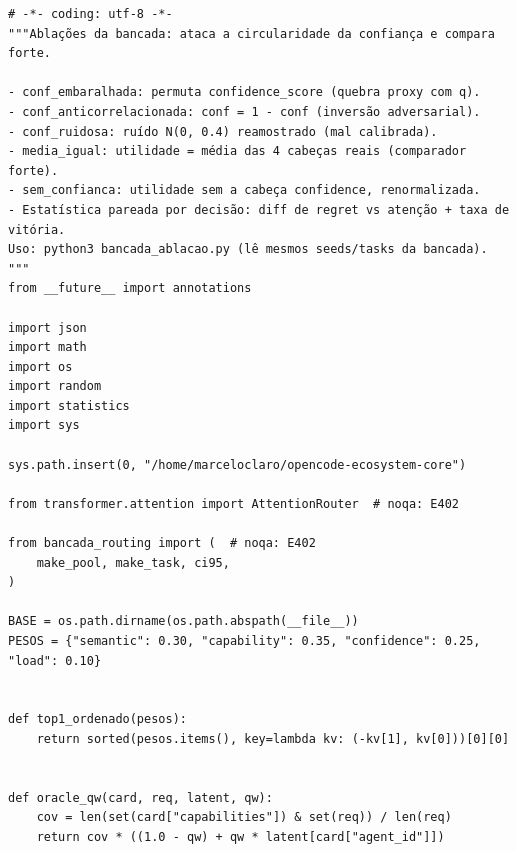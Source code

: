 \documentclass[12pt,openany,oneside,a4paper,brazil,chapter=TITLE]{abntex2}
\begin{document}
\begin{lstlisting}
# -*- coding: utf-8 -*-
"""Ablações da bancada: ataca a circularidade da confiança e compara forte.

- conf_embaralhada: permuta confidence_score (quebra proxy com q).
- conf_anticorrelacionada: conf = 1 - conf (inversão adversarial).
- conf_ruidosa: ruído N(0, 0.4) reamostrado (mal calibrada).
- media_igual: utilidade = média das 4 cabeças reais (comparador forte).
- sem_confianca: utilidade sem a cabeça confidence, renormalizada.
- Estatística pareada por decisão: diff de regret vs atenção + taxa de vitória.
Uso: python3 bancada_ablacao.py (lê mesmos seeds/tasks da bancada).
"""
from __future__ import annotations

import json
import math
import os
import random
import statistics
import sys

sys.path.insert(0, "/home/marceloclaro/opencode-ecosystem-core")

from transformer.attention import AttentionRouter  # noqa: E402

from bancada_routing import (  # noqa: E402
    make_pool, make_task, ci95,
)

BASE = os.path.dirname(os.path.abspath(__file__))
PESOS = {"semantic": 0.30, "capability": 0.35, "confidence": 0.25, "load": 0.10}


def top1_ordenado(pesos):
    return sorted(pesos.items(), key=lambda kv: (-kv[1], kv[0]))[0][0]


def oracle_qw(card, req, latent, qw):
    cov = len(set(card["capabilities"]) & set(req)) / len(req)
    return cov * ((1.0 - qw) + qw * latent[card["agent_id"]])



\end{lstlisting}
\end{document}
